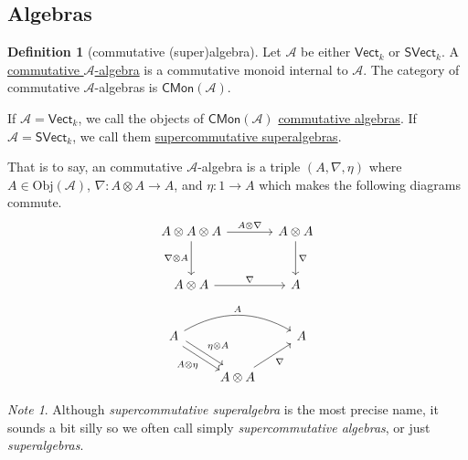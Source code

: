 \documentclass[a4paper,10pt]{scrreprt}
\newcommand{\defn}[1]{\ul{#1}}
\newcommand{\Obj}{\mathrm{Obj}}
\theoremstyle{definition}
\newtheorem{definition}{Definition}[section]
\theoremstyle{plain}
\theoremstyle{remark}
\newtheorem{note}{Note}[section]
\begin{document}
\subsection{Algebras} \label{sec:algebras}
\begin{definition}[commutative (super)algebra]
  \label{def:commutativesuperornotalgebra}
  Let $\mathscr{A}$ be either $\mathsf{Vect}_{k}$ or $\mathsf{SVect}_{k}$. A \defn{commutative $\mathscr{A}$-algebra} is a commutative monoid internal to $\mathscr{A}$. The category of commutative $\mathscr{A}$-algebras is $\mathsf{CMon}(\mathscr{A})$.

  If $\mathscr{A} = \mathsf{Vect}_{k}$, we call the objects of $\mathsf{CMon}(\mathscr{A})$ \defn{commutative algebras}. If $\mathscr{A} = \mathsf{SVect}_{k}$, we call them \defn{supercommutative superalgebras}.

  That is to say, an commutative $\mathscr{A}$-algebra is a triple $(A, \nabla, \eta)$ where $A \in \Obj(\mathscr{A})$, $\nabla\colon A \otimes A \to A$, and $\eta\colon 1 \to A$ which makes the following diagrams commute.
  \begin{equation*}
    \begin{tikzcd}[row sep=large, column sep=large]
      A \otimes A \otimes A
      \arrow[r, "A \otimes \nabla"]
      \arrow[d, swap, "\nabla \otimes A"]
      & A \otimes A 
      \arrow[d, "\nabla"]
      \\
      A \otimes A
      \arrow[r, "\nabla"]
      & A
    \end{tikzcd}
  \end{equation*}
  \begin{equation*}
    \begin{tikzcd}
      A 
      \arrow[rr, bend left, "A"]
      \arrow[dr, shift left, "\eta \otimes A"]
      \arrow[dr, shift right, swap, "A \otimes \eta"]
      & & A
      \\
      & A \otimes A
      \arrow[ur, swap, "\nabla"]
    \end{tikzcd}
  \end{equation*}
\end{definition}

\begin{note}
  Although \emph{supercommutative superalgebra} is the most precise name, it sounds a bit silly so we often call simply \emph{supercommutative algebras}, or just \emph{superalgebras}.
\end{note}
\end{document}
